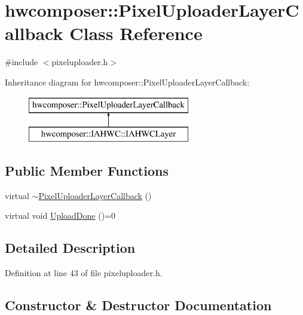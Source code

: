 \hypertarget{classhwcomposer_1_1PixelUploaderLayerCallback}{}\section{hwcomposer\+:\+:Pixel\+Uploader\+Layer\+Callback Class Reference}
\label{classhwcomposer_1_1PixelUploaderLayerCallback}


{\ttfamily \#include $<$pixeluploader.\+h$>$}

Inheritance diagram for hwcomposer\+:\+:Pixel\+Uploader\+Layer\+Callback\+:\begin{figure}[H]
\begin{center}
\leavevmode
\includegraphics[height=2.000000cm]{classhwcomposer_1_1PixelUploaderLayerCallback}
\end{center}
\end{figure}
\subsection*{Public Member Functions}
\begin{DoxyCompactItemize}
\item 
virtual \mbox{\hyperlink{classhwcomposer_1_1PixelUploaderLayerCallback_abad384dcc1d8227f10b95e45a3bdde32}{$\sim$\+Pixel\+Uploader\+Layer\+Callback}} ()
\item 
virtual void \mbox{\hyperlink{classhwcomposer_1_1PixelUploaderLayerCallback_a3234bfd4e803b50e8f41cb53ff430559}{Upload\+Done}} ()=0
\end{DoxyCompactItemize}


\subsection{Detailed Description}


Definition at line 43 of file pixeluploader.\+h.



\subsection{Constructor \& Destructor Documentation}
\mbox{\label{classhwcomposer_1_1PixelUploaderLayerCallback_abad384dcc1d8227f10b95e45a3bdde32}} 
